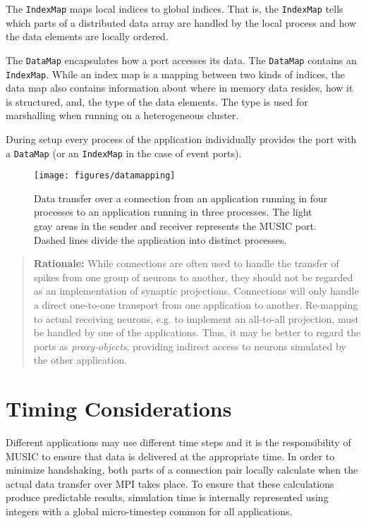 \documentclass[a4paper,twoside]{report}
\newenvironment{rationale}%
{\par\begin{quote}\textbf{Rationale:}}%
{\par\end{quote}}
\begin{document}
The \lstinline|IndexMap| maps local indices to global indices.  That
is, the \lstinline|IndexMap| tells which parts of a distributed data
array are handled by the local process and how the data elements are
locally ordered.

The \lstinline|DataMap| encapsulates how a port accesses its data.
The \lstinline|DataMap| contains an \lstinline|IndexMap|.  While an
index map is a mapping between two kinds of indices, the data map also
contains information about where in memory data resides, how it is
structured, and, the type of the data elements.  The type is used for
marshalling when running on a heterogeneous cluster.

During setup every process of the application individually provides
the port with a \lstinline|DataMap| (or an \lstinline|IndexMap| in
the case of event ports).

\begin{figure}
  \begin{center}
    \texttt{[image: figures/datamapping]}
    \caption[Mapping of data]{\label{fig:datamapping} Data transfer
      over a connection from an application running in four processes
      to an application running in three processes.  The light gray
      areas in the sender and receiver represents the MUSIC port.
      Dashed lines divide the application into distinct processes.  }
  \end{center}
\end{figure}

\begin{rationale}
  While connections are often used to handle the transfer of spikes
  from one group of neurons to another, they should not be regarded as
  an implementation of synaptic projections.
  Connections will only handle a direct one-to-one transport from one
  application to another.  Re-mapping to actual receiving neurons,
  e.g. to implement an all-to-all projection, must be handled by one
  of the applications.  Thus, it may be better to regard the ports as
  \emph{proxy-objects}, providing indirect access
  to neurons simulated by the other application.
\end{rationale}


\section{Timing Considerations}
\label{sec:timing}
  
Different applications may use different time steps and it is the
responsibility of MUSIC to ensure that data is delivered at the
appropriate time.  In order to minimize handshaking, both parts of a
connection pair locally calculate when the actual data transfer over
MPI takes place.  To ensure that these calculations produce
predictable results, simulation time is internally represented using
integers with a global micro-timestep common for
all applications.
\end{document}
